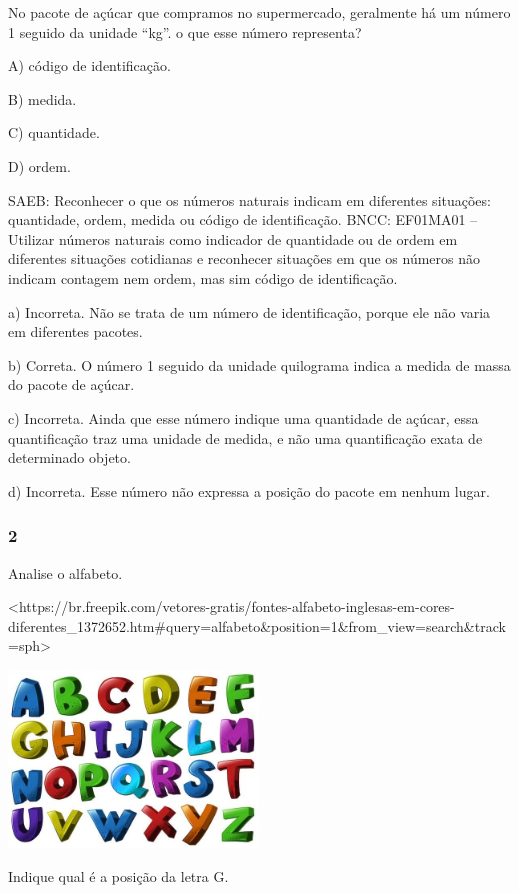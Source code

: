 No pacote de açúcar que compramos no supermercado, geralmente há um número
1 seguido da unidade ``kg''. o que esse número representa?

A) código de identificação.

B) medida.

C) quantidade.

D) ordem.

SAEB: Reconhecer o que os números naturais indicam em diferentes
situações: quantidade, ordem, medida ou código de identificação.
BNCC: EF01MA01 -- Utilizar números naturais como indicador de quantidade
ou de ordem em diferentes situações cotidianas e reconhecer situações em
que os números não indicam contagem nem ordem, mas sim código de
identificação.

a) Incorreta. Não se trata de um número de identificação, porque ele não varia em diferentes pacotes.

b) Correta. O número 1 seguido da unidade quilograma indica a medida de
massa do pacote de açúcar.

c) Incorreta. Ainda que esse número indique uma quantidade de açúcar,
essa quantificação traz uma unidade de medida, e não uma
quantificação exata de determinado objeto.

d) Incorreta. Esse número não expressa a posição do pacote em nenhum
lugar.

\subsubsection{2}\label{section-88}

Analise o alfabeto.

\textless{}https://br.freepik.com/vetores-gratis/fontes-alfabeto-inglesas-em-cores-diferentes\_1372652.htm\#query=alfabeto\&position=1\&from\_view=search\&track=sph\textgreater{}

\includegraphics[width=2.61848in,height=1.85732in]{media/image106.jpg}

Indique qual é a posição da letra G.

